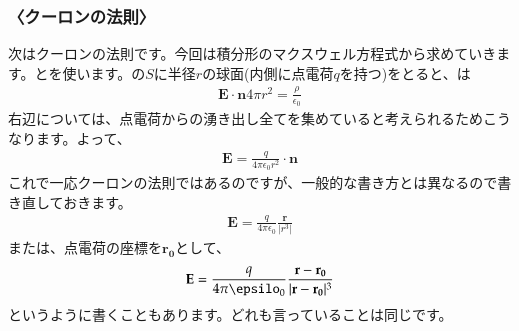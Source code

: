 \documentclass[10pt,b5paper,papersize,dvipdfmx]{jsbook}
\begin{document}
\subsubsection{〈クーロンの法則〉}
次はクーロンの法則です。今回は積分形のマクスウェル方程式から求めていきます。とを使います。の$S$に半径$r$の球面(内側に点電荷$q$を持つ)をとると、は
\begin{align}
\mathbf{E}\cdot\mathbf{n}4\pi r^2 = \frac{\rho}{\epsilon_0}
\end{align}
右辺については、点電荷からの湧き出し全てを集めていると考えられるためこうなります。よって、
\begin{align}
\mathbf{E} = \frac{q}{4\pi\epsilon_0 r^2}\cdot\mathbf{n}
\end{align}
これで一応クーロンの法則ではあるのですが、一般的な書き方とは異なるので書き直しておきます。
\begin{align}
\mathbf{E} = \frac{q}{4\pi\epsilon_0}\frac{\mathbf{r}}{|r^3|}
\end{align}
または、点電荷の座標を$\mathbf{r_0}$として、
\begin{align}
\mathbf{E} = \frac{q}{4\pi\epsilo_0}\frac{\mathbf{r}-\mathbf{r_0}}{|\mathbf{r}-\mathbf{r_0}|^3}
\end{align}
というように書くこともあります。どれも言っていることは同じです。
\end{document}

